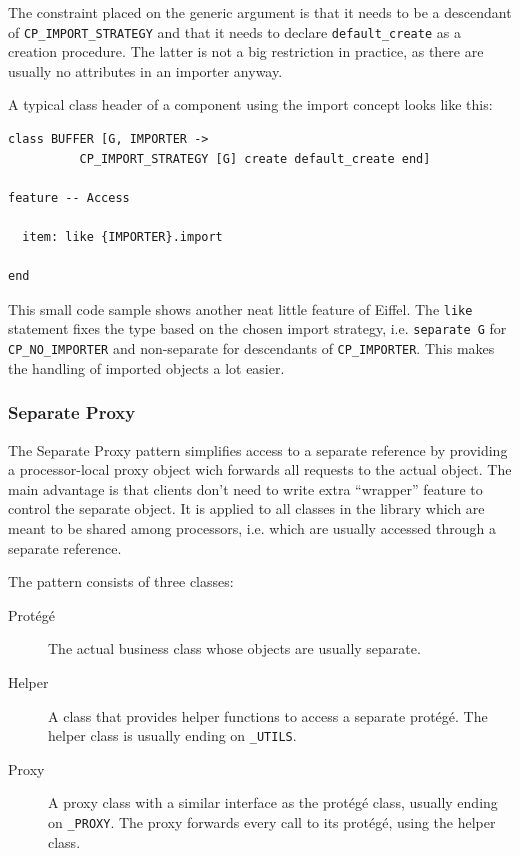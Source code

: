 \documentclass[a4paper,10pt]{article}
\begin{document}
The constraint placed on the generic argument is that it needs to be a descendant of \lstinline!CP_IMPORT_STRATEGY! and that it needs to declare \lstinline!default_create! as a creation procedure.
The latter is not a big restriction in practice, as there are usually no attributes in an importer anyway.

A typical class header of a component using the import concept looks like this:
\begin{lstlisting}[language=OOSC2Eiffel, captionpos=b, caption={An example component with import.}]
class BUFFER [G, IMPORTER -> 
          CP_IMPORT_STRATEGY [G] create default_create end]

feature -- Access

  item: like {IMPORTER}.import

end
\end{lstlisting}

This small code sample shows another neat little feature of Eiffel.
The \lstinline!like! statement fixes the type based on the chosen import strategy, i.e. \lstinline!separate G! for \lstinline!CP_NO_IMPORTER! and non-separate for descendants of \lstinline!CP_IMPORTER!.
This makes the handling of imported objects a lot easier.

\subsubsection{Separate Proxy}

The Separate Proxy pattern  simplifies access to a separate reference by providing a processor-local proxy object wich forwards all requests to the actual object.
The main advantage is that clients don't need to write extra ``wrapper'' feature to control the separate object.
It is applied to all classes in the library which are meant to be shared among processors, i.e. which are usually accessed through a separate reference.

The pattern consists of three classes:
\begin{description}
 \item [Protégé] The actual business class whose objects are usually separate.
 \item [Helper] A class that provides helper functions to access a separate protégé.
  The helper class is usually ending on \lstinline!_UTILS!.
 \item [Proxy] A proxy class with a similar interface as the protégé class, usually ending on \lstinline!_PROXY!.
    The proxy forwards every call to its protégé, using the helper class.
\end{description}
\end{document}
